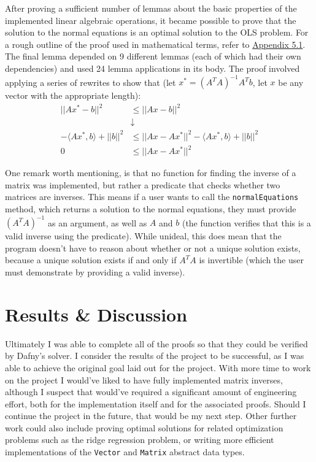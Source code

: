 \documentclass[12pt]{article}
\begin{document}
After proving a sufficient number of lemmas about the basic properties of the implemented linear algebraic operations, it became possible to prove that the solution to the normal equations is an optimal solution to the OLS problem. For a rough outline of the proof used in mathematical terms, refer to \hyperref[sec:mathproof]{Appendix 5.1}. The final lemma depended on 9 different lemmas (each of which had their own dependencies) and used 24 lemma applications in its body. The proof involved applying a series of rewrites to show that (let $x^* = (A^T A)^{-1} A^T b$, let $x$ be any vector with the appropriate length):
\begin{align*}
||Ax^* - b||^2 &\le ||Ax - b||^2 \\
&\downarrow \\
-\langle Ax^*, b \rangle + ||b||^2 &\le ||Ax - Ax^*||^2 - \langle Ax^*, b \rangle + ||b||^2 \\
0 &\le ||Ax - Ax^*||^2
\end{align*}

One remark worth mentioning, is that no function for finding the inverse of a matrix was implemented, but rather a predicate that checks whether two matrices are inverses. This means if a user wants to call the \verb|normalEquations| method, which returns a solution to the normal equations, they must provide $(A^T A)^{-1}$ as an argument, as well as $A$ and $b$ (the function verifies that this is a valid inverse using the predicate). While unideal, this does mean that the program doesn't have to reason about whether or not a unique solution exists, because a unique solution exists if and only if $A^T A$ is invertible (which the user must demonstrate by providing a valid inverse).

\section{Results \& Discussion}
Ultimately I was able to complete all of the proofs so that they could be verified by Dafny's solver. I consider the results of the project to be successful, as I was able to achieve the original goal laid out for the project. With more time to work on the project I would've liked to have fully implemented matrix inverses, although I suspect that would've required a significant amount of engineering effort, both for the implementation itself and for the associated proofs. Should I continue the project in the future, that would be my next step. Other further work could also include proving optimal solutions for related optimization problems such as the ridge regression problem, or writing more efficient implementations of the \verb|Vector| and \verb|Matrix| abstract data types.
\end{document}
